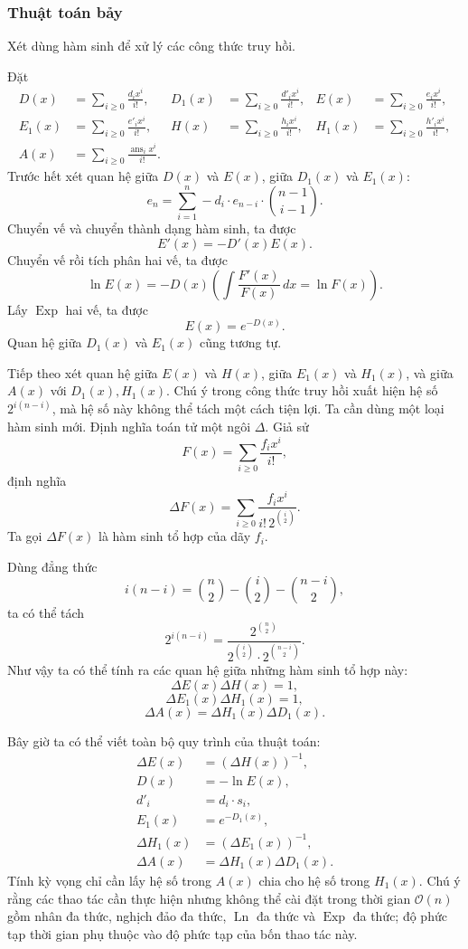 \documentclass[11pt]{article}
\newcommand{\Oh}{\mathcal{O}}
\begin{document}
\subsubsection{Thuật toán bảy}

Xét dùng hàm sinh để xử lý các công thức truy hồi.

Đặt
\[
\begin{aligned}
D(x)&=\sum_{i\ge 0}\frac{d_i x^i}{i!},&
D_1(x)&=\sum_{i\ge 0}\frac{d'_i x^i}{i!},&
E(x)&=\sum_{i\ge 0}\frac{e_i x^i}{i!},\\
E_1(x)&=\sum_{i\ge 0}\frac{e'_i x^i}{i!},&
H(x)&=\sum_{i\ge 0}\frac{h_i x^i}{i!},&
H_1(x)&=\sum_{i\ge 0}\frac{h'_i x^i}{i!},\\
A(x)&=\sum_{i\ge 0}\frac{\operatorname{ans}_i x^i}{i!}.&&&
\end{aligned}
\]
Trước hết xét quan hệ giữa \(D(x)\) và \(E(x)\), giữa \(D_1(x)\) và
\(E_1(x)\):
\[
  e_n=\sum_{i=1}^{n}
  -d_i\cdot e_{n-i}\cdot \binom{n-1}{i-1}.
\]
Chuyển vế và chuyển thành dạng hàm sinh, ta được
\[
  E'(x)=-D'(x)E(x).
\]
Chuyển vế rồi tích phân hai vế, ta được
\[
  \ln E(x)=-D(x)\left(\int\frac{F'(x)}{F(x)}\,dx=\ln F(x)\right).
\]
Lấy \(\operatorname{Exp}\) hai vế, ta được
\[
  E(x)=e^{-D(x)}.
\]
Quan hệ giữa \(D_1(x)\) và \(E_1(x)\) cũng tương tự.

Tiếp theo xét quan hệ giữa \(E(x)\) và \(H(x)\), giữa \(E_1(x)\) và
\(H_1(x)\), và giữa \(A(x)\) với \(D_1(x),H_1(x)\). Chú ý trong công thức truy
hồi xuất hiện hệ số \(2^{i(n-i)}\), mà hệ số này không thể tách một cách tiện
lợi. Ta cần dùng một loại hàm sinh mới. Định nghĩa toán tử một ngôi \(\Delta\).
Giả sử
\[
  F(x)=\sum_{i\ge 0}\frac{f_i x^i}{i!},
\]
định nghĩa
\[
  \Delta F(x)=\sum_{i\ge 0}\frac{f_i x^i}{i!\,2^{\binom{i}{2}}}.
\]
Ta gọi \(\Delta F(x)\) là hàm sinh tổ hợp của dãy \(f_i\).

Dùng đẳng thức
\[
  i(n-i)=\binom{n}{2}-\binom{i}{2}-\binom{n-i}{2},
\]
ta có thể tách
\[
  2^{i(n-i)}
  =
  \frac{2^{\binom{n}{2}}}
       {2^{\binom{i}{2}}\cdot 2^{\binom{n-i}{2}}}.
\]
Như vậy ta có thể tính ra các quan hệ giữa những hàm sinh tổ hợp này:
\[
  \Delta E(x)\Delta H(x)=1,
\]
\[
  \Delta E_1(x)\Delta H_1(x)=1,
\]
\[
  \Delta A(x)=\Delta H_1(x)\Delta D_1(x).
\]

Bây giờ ta có thể viết toàn bộ quy trình của thuật toán:
\[
\begin{aligned}
\Delta E(x)&=(\Delta H(x))^{-1},\\
D(x)&=-\ln E(x),\\
d'_i&=d_i\cdot s_i,\\
E_1(x)&=e^{-D_1(x)},\\
\Delta H_1(x)&=(\Delta E_1(x))^{-1},\\
\Delta A(x)&=\Delta H_1(x)\Delta D_1(x).
\end{aligned}
\]
Tính kỳ vọng chỉ cần lấy hệ số trong \(A(x)\) chia cho hệ số trong \(H_1(x)\).
Chú ý rằng các thao tác cần thực hiện nhưng không thể cài đặt trong thời gian
\(\Oh(n)\) gồm nhân đa thức, nghịch đảo đa thức, \(\operatorname{Ln}\) đa thức
và \(\operatorname{Exp}\) đa thức; độ phức tạp thời gian phụ thuộc vào độ phức
tạp của bốn thao tác này.
\end{document}
